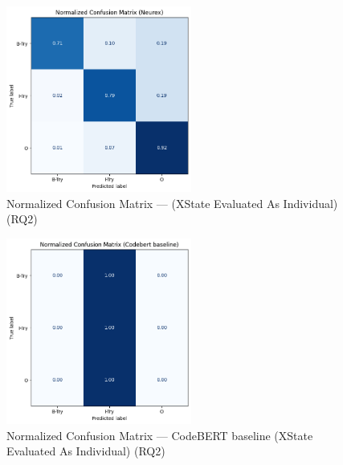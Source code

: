 \begin{figure}[t]
 	\centering
 	\includegraphics[width=2.4in]{rq2_cm_neurex.png}
        \vspace{-10pt}
 	\caption{Normalized Confusion Matrix --- {\tool} (XState Evaluated As Individual) (RQ2)}
 	\label{fig:rq2-cm-codebert}	
\end{figure}

\begin{figure}[t]
 	\centering
 	\includegraphics[width=2.4in]{rq2_cm_codebert.png}
        \vspace{-10pt}
 	\caption{Normalized Confusion Matrix --- CodeBERT baseline (XState Evaluated As Individual) (RQ2)}
 	\label{fig:rq2-cm-neurex}	
\end{figure}